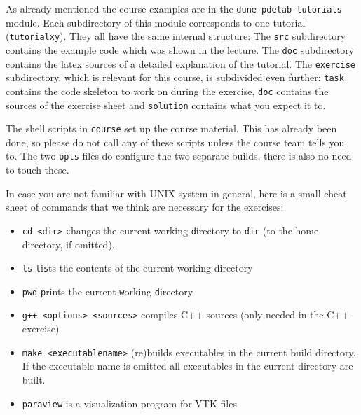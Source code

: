 \documentclass{article}
\begin{document}
As already mentioned the course examples are in the
\verb!dune-pdelab-tutorials! module. Each subdirectory of this module
corresponds to one tutorial (\verb!tutorialxy!). They all have the
same internal structure: The \verb!src! subdirectory contains the
example code which was shown in the lecture. The \verb!doc!
subdirectory contains the latex sources of a detailed explanation of
the tutorial. The \verb!exercise! subdirectory, which is relevant for
this course, is subdivided even further: \verb!task!  contains the code
skeleton to work on during the exercise, \verb!doc! contains the
sources of the exercise sheet and \verb!solution!  contains what you
expect it to.

The shell scripts in \verb!course! set up the course
material. This has already been done, so please do not call any of
these scripts unless the course team tells you to. The two \verb!opts!
files do configure the two separate builds, there is also no need to
touch these.

In case you are not familiar with UNIX system in general, here is a
small cheat sheet of commands that we think are necessary for the
exercises:
\begin{itemize}
\item \verb!cd <dir>! \verb!c!hanges the current working
  \verb!d!irectory to \verb!dir! (to the home directory, if omitted).
\item \verb!ls! \verb!l!i\verb!s!ts the contents of the current
  working directory
\item \verb!pwd! \verb!p!rints the current \verb!w!orking
  \verb!d!irectory
\item \verb!g++ <options> <sources>! compiles C++ sources (only needed
  in the C++ exercise)
\item \verb!make <executablename>! (re)builds executables in the
  current build directory. If the executable name is omitted all
  executables in the current directory are built.
 \item \verb!paraview! is a visualization program for VTK files
\end{itemize}
\end{document}
